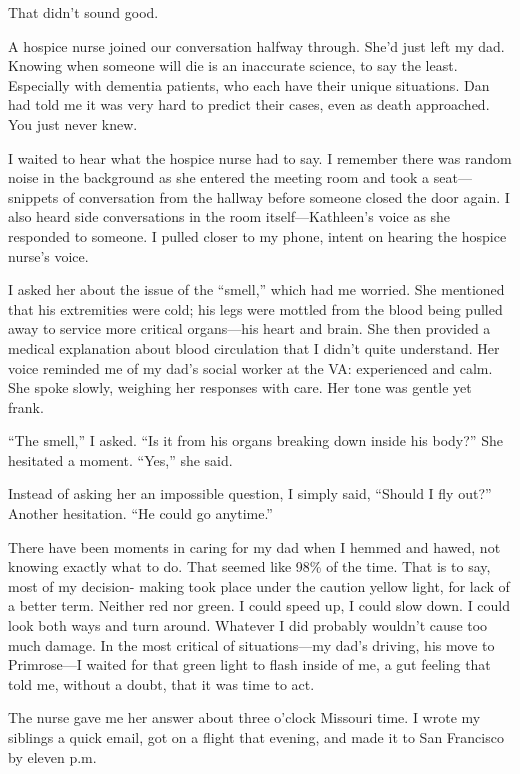 \documentclass[12pt]{book}
\begin{document}
That didn't sound good.

A hospice nurse joined our conversation halfway through. She'd just left my dad. Knowing when someone will die is an inaccurate science, to say the least. Especially with dementia patients, who each have their unique situations. Dan had told me it was very hard to predict their cases, even as death approached. You just never knew.

I waited to hear what the hospice nurse had to say. I remember there was random noise in the background as she entered the meeting room and took a seat---snippets of conversation from the hallway before someone closed the door again. I also heard side conversations in the room itself---Kathleen's voice as she responded to someone. I pulled closer to my phone, intent on hearing the hospice nurse's voice.

I asked her about the issue of the ``smell,'' which had me worried. She mentioned that his extremities were cold; his legs were mottled from the blood being pulled away to service more critical organs---his heart and brain. She then provided a medical explanation about blood circulation that I didn't quite understand. Her voice reminded me of my dad's social worker at the VA: experienced and calm. She spoke slowly, weighing her responses with care. Her tone was gentle yet frank.

``The smell,'' I asked. ``Is it from his organs breaking down inside his body?'' She hesitated a moment. ``Yes,'' she said.

Instead of asking her an impossible question, I simply said, ``Should I fly out?'' Another hesitation. ``He could go anytime.''

There have been moments in caring for my dad when I hemmed and hawed, not knowing exactly what to do. That seemed like 98\% of the time. That is to say, most of my decision- making took place under the caution yellow light, for lack of a better term. Neither red nor green. I could speed up, I could slow down. I could look both ways and turn around. Whatever I did probably wouldn't cause too much damage. In the most critical of situations---my dad's driving, his move to Primrose---I waited for that green light to flash inside of me, a gut feeling that told me, without a doubt, that it was time to act.

The nurse gave me her answer about three o'clock Missouri time. I wrote my siblings a quick email, got on a flight that evening, and made it to San Francisco by eleven p.m. 
\end{document}

